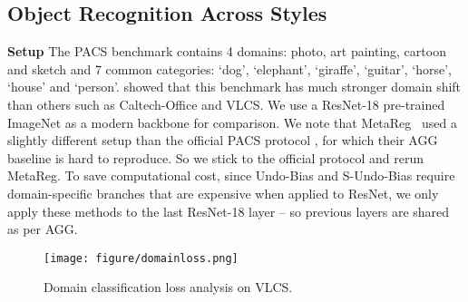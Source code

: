 \documentclass[runningheads]{llncs}
\newcommand{\hundo}{S-Undo-Bias}
\newcommand{\keypoint}[1]{\vspace{0.1cm}\noindent\textbf{#1}\quad}
\begin{document}
\subsection{Object Recognition Across Styles}
\keypoint{Setup}
The PACS benchmark \cite{da2017dg} contains 4 domains: photo, art painting, cartoon and sketch and 7 common categories: `dog', `elephant', `giraffe', `guitar', `horse', `house' and `person'. \cite{da2017dg} showed that this benchmark has much stronger domain shift than others such as Caltech-Office and VLCS. We use a ResNet-18 pre-trained ImageNet as a modern backbone for comparison. We note that MetaReg~\cite{NIPS2018_metareg} used a slightly different setup than the official PACS protocol \cite{da2017dg}, for which their AGG baseline is hard to reproduce. So we stick to the official protocol and rerun MetaReg. To save computational cost, since Undo-Bias and \hundo{} require domain-specific branches that are expensive when applied to ResNet, we only apply these methods to the last ResNet-18 layer -- so previous layers are shared as per AGG.





\begin{figure}[t]
    \centering
    \texttt{[image: figure/domainloss.png]}
\caption{Domain classification loss analysis on VLCS.}
    \label{fig:domain-clf-loss}
\end{figure}
\end{document}
